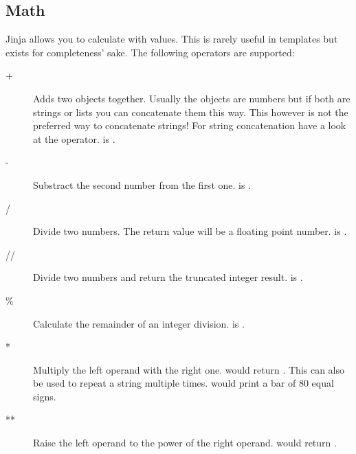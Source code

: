 \documentclass[a4paper,10pt,english]{sphinxmanual}
\begin{document}
\subsection{Math}
\label{templates:math}
Jinja allows you to calculate with values.  This is rarely useful in templates
but exists for completeness' sake.  The following operators are supported:
\begin{description}
\item[{+}] \leavevmode
Adds two objects together.  Usually the objects are numbers but if both are
strings or lists you can concatenate them this way.  This however is not
the preferred way to concatenate strings!  For string concatenation have
a look at the \code{\textasciitilde{}} operator.   is .

\item[{-}] \leavevmode
Substract the second number from the first one.   is .

\end{description}
\begin{description}
\item[{/}] \leavevmode
Divide two numbers.  The return value will be a floating point number.
 is .

\end{description}
\begin{description}
\item[{//}] \leavevmode
Divide two numbers and return the truncated integer result.
 is .

\end{description}
\begin{description}
\item[{\%}] \leavevmode
Calculate the remainder of an integer division.   is .

\item[{*}] \leavevmode
Multiply the left operand with the right one.   would
return .  This can also be used to repeat a string multiple times.
 would print a bar of 80 equal signs.

\item[{**}] \leavevmode
Raise the left operand to the power of the right operand.  
would return .

\end{description}
\end{document}
